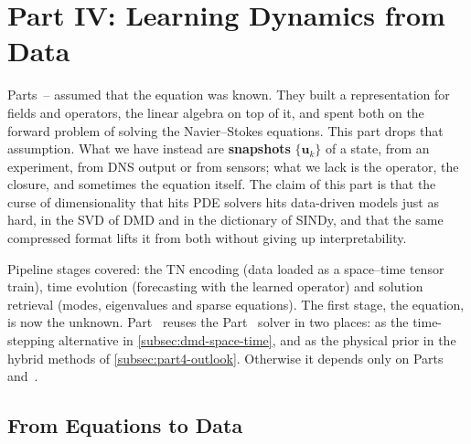 \section{Part IV: Learning Dynamics from Data}
\label{sec:part4}


Parts~-- assumed that the equation was known. They built
a representation for fields and operators, the linear algebra on top of it, and
spent both on the forward problem of solving the Navier--Stokes equations. This
part drops that assumption. What we have instead are \textbf{snapshots}
$\{\mathbf u_k\}$ of a state, from an experiment, from DNS output or from
sensors; what we lack is the operator, the closure, and sometimes the equation
itself. The claim of this part is that the curse of dimensionality that hits PDE
solvers hits data-driven models just as hard, in the SVD of DMD and in the
dictionary of SINDy, and that the same compressed format lifts it from both
without giving up interpretability.

Pipeline stages covered: the TN encoding (data loaded as a space--time tensor
train), time evolution (forecasting with the learned operator) and solution
retrieval (modes, eigenvalues and sparse equations). The first stage, the
equation, is now the unknown. Part~ reuses the Part~
solver in two places: as the time-stepping alternative in
\cref{subsec:dmd-space-time}, and as the physical prior in the hybrid methods of
\cref{subsec:part4-outlook}. Otherwise it depends only on
Parts~ and~.

\subsection{From Equations to Data}
\label{subsec:inverse-problem}

